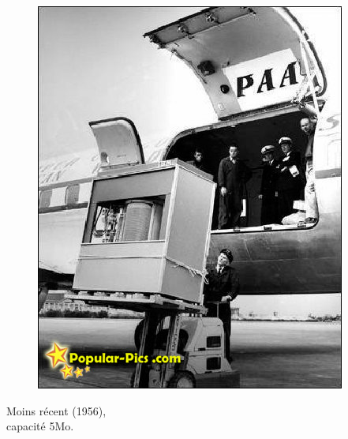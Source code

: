 \begin{frame}
\frametitle{\insertsubsection}
\begin{multicols}{2}
\begin{minipage}[t]{1\linewidth}
\begin{figure}
  \vspace{-1cm}
  \includegraphics[width=1.1\linewidth]{fig3/5MB-Hard-Disk-in-1956.png}
\end{figure}
\end{minipage}
\vspace{2cm}
\center Moins récent (1956),\\
capacité 5Mo. 
\end{multicols}
\end{frame}

